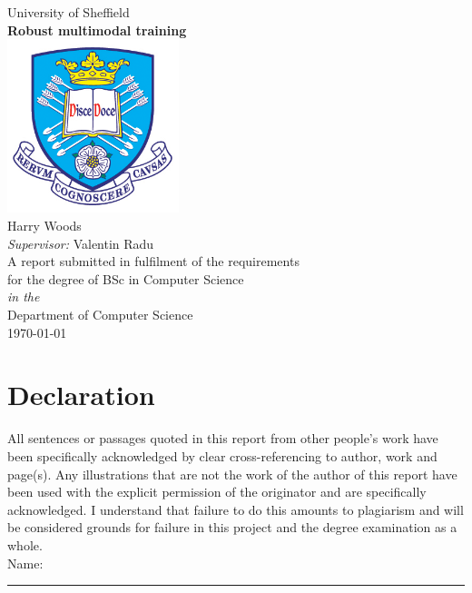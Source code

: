 \documentclass[11pt,oneside]{book}
\begin{document}
\frontmatter

\begin{titlepage}

\begin{center}
{\LARGE University of Sheffield}\\[1.5cm]
\linespread{1.2}\huge {\bfseries Robust multimodal training}\\[1.5cm]
\linespread{1}
\includegraphics[width=5cm]{images/tuoslogo.png}\\[1cm]
{\Large Harry Woods}\\[1cm]
{\large \emph{Supervisor:} Valentin Radu}\\[1cm]
\large A report submitted in fulfilment of the requirements\\ for the degree of BSc in Computer Science\\[0.3cm] 
\textit{in the}\\[0.3cm]
Department of Computer Science\\[2cm]
\today
\end{center}

\end{titlepage}

\newpage
\chapter*{\Large Declaration}


All sentences or passages quoted in this report from other people's work have been specifically acknowledged by clear cross-referencing to author, work and page(s). Any illustrations that are not the work of the author of this report have been used with the explicit permission of the originator and are specifically acknowledged. I understand that failure to do this amounts to plagiarism and will be considered grounds for failure in this project and the degree examination as a whole.\\[1cm]

\noindent Name:\\[1mm]
\rule[1em]{25em}{0.5pt}
\end{document}

